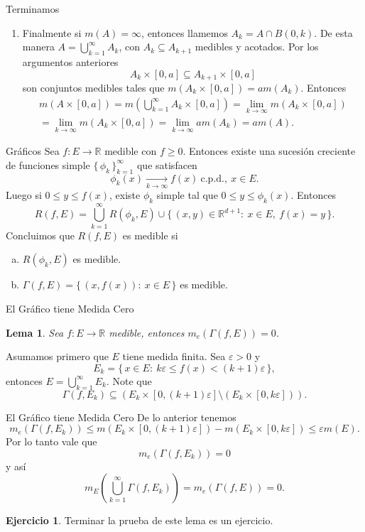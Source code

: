 \documentclass[utf8]{beamer}
\theoremstyle{plain}
\newtheorem{Lem}{Lema}                 %
\theoremstyle{definition}
\newtheorem{Ej}{Ejercicio}             %
\theoremstyle{remark}
\numberwithin{equation}{section}
\newcommand{\eps}{\varepsilon}          %
\newcommand{\Ga}{\Gamma}                %
\newcommand{\bR}{\mathbb{R}}    %
\newcommand{\set}[1]{\{\,#1\,\}}    %
\newcommand{\x}{\times}
\renewcommand{\geq}{\geqslant}          %
\renewcommand{\leq}{\leqslant}          %
\newcommand{\less}{\setminus}           %
\newcommand{\suck}{_{k=1}^\infty} %
\renewcommand{\.}{\Cdot}                %
\begin{document}
\begin{frame}{Terminamos}
  \begin{enumerate}
    \setcounter{enumi}{\value{saveenumi}}
    \item Finalmente si $m(A)=\infty$, entonces llamemos $A_k=A\cap B(0,k)$. De esta manera $A=\bigcup\suck A_k$, con $A_k\subseteq A_{k+1}$ medibles y acotados. Por los argumentos anteriores 
    $$A_k\x[0,a]\subseteq A_{k+1}\x[0,a]$$
    son conjuntos medibles tales que $m(A_k\x[0,a])=am(A_k)$. Entonces
    \begin{gather*}
      m(A\x[0,a])=m\left(\bigcup\suck A_k\x [0,a]\right)=\lim_{k\to\infty}m(A_k\x[0,a])\\
      =\lim_{k\to\infty} m(A_k\x[0,a])=\lim_{k\to\infty} am(A_k)=am(A).
    \end{gather*}
    
  \end{enumerate}
\end{frame}

\begin{frame}{Gráficos}
  Sea $f:E\to\bR$ medible con $f\geq 0$. Entonces existe una sucesión creciente de funciones simple $\set{\phi_k}\suck$ que satisfacen
  $$\phi_k(x)\xrightarrow[k\to\infty]{}f(x)\ \text{c.p.d.},\ x\in E.$$
  Luego si $0\leq y\leq f(x)$, existe $\phi_k$ simple tal que $0\leq y\leq \phi_k(x)$. Entonces
  $$R(f,E)=\bigcup\suck R(\phi_k,E)\cup\set{(x,y)\in\bR^{d+1}:\ x\in E,\ f(x)=y}.$$
  Concluimos que $R(f,E)$ es medible si 
  \begin{enumerate}[(a)]
    \item $R(\phi_k,E)$ es medible.
    \item $\Ga(f,E)=\set{(x,f(x)):\ x\in E}$ es medible.
  \end{enumerate}
\end{frame}

\begin{frame}{El Gráfico tiene Medida Cero}
  \begin{Lem}\label{lem:GrafMedidaCero}
    Sea $f:E\to\bR$ medible, entonces $m_e(\Ga(f,E))=0$.
  \end{Lem}
  Asumamos primero que $E$ tiene medida finita. Sea $\eps>0$ y 
  $$E_k=\set{x\in E:\ k\eps\leq f(x)<(k+1)\eps},$$
  entonces $E=\bigcup\suck E_k$. Note que 
  $$\Ga(f,E_k)\subseteq (E_k\x[0,(k+1)\eps]\less(E_k\x[0,k\eps])).$$
\end{frame}

\begin{frame}{El Gráfico tiene Medida Cero}
  De lo anterior tenemos 
  $$m_e(\Ga(f,E_k))\leq m(E_k\x[0,(k+1)\eps])-m(E_k\x[0,k\eps])\leq\eps m(E).$$
  Por lo tanto vale que 
  $$m_e(\Ga(f,E_k))=0$$
  y así 
  $$m_E(\bigcup\suck\Ga(f,E_k))=m_e(\Ga(f,E))=0.$$
  \begin{Ej}\label{ej:termPruebaGrafMedCero}
    Terminar la prueba de este lema es un ejercicio.
  \end{Ej}
\end{frame}
\end{document}
